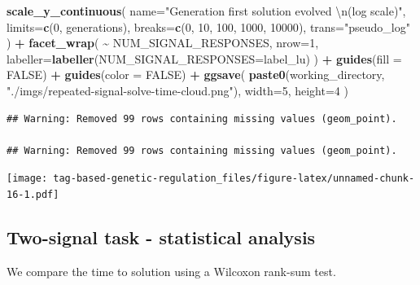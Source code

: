 \documentclass[
]{book}
\newenvironment{Shaded}{\begin{snugshade}}{\end{snugshade}}
\newcommand{\CharTok}[1]{\textcolor[rgb]{0.31,0.60,0.02}{#1}}
\newcommand{\DataTypeTok}[1]{\textcolor[rgb]{0.13,0.29,0.53}{#1}}
\newcommand{\DecValTok}[1]{\textcolor[rgb]{0.00,0.00,0.81}{#1}}
\newcommand{\KeywordTok}[1]{\textcolor[rgb]{0.13,0.29,0.53}{\textbf{#1}}}
\newcommand{\NormalTok}[1]{#1}
\newcommand{\OperatorTok}[1]{\textcolor[rgb]{0.81,0.36,0.00}{\textbf{#1}}}
\newcommand{\OtherTok}[1]{\textcolor[rgb]{0.56,0.35,0.01}{#1}}
\newcommand{\StringTok}[1]{\textcolor[rgb]{0.31,0.60,0.02}{#1}}
\begin{document}
\begin{Shaded}
\begin{Highlighting}[]
\StringTok{  }\KeywordTok{scale\_y\_continuous}\NormalTok{(}
    \DataTypeTok{name=}\StringTok{"Generation first solution evolved }\CharTok{\textbackslash{}n}\StringTok{(log scale)"}\NormalTok{,}
    \DataTypeTok{limits=}\KeywordTok{c}\NormalTok{(}\DecValTok{0}\NormalTok{, generations),}
    \DataTypeTok{breaks=}\KeywordTok{c}\NormalTok{(}\DecValTok{0}\NormalTok{, }\DecValTok{10}\NormalTok{, }\DecValTok{100}\NormalTok{, }\DecValTok{1000}\NormalTok{, }\DecValTok{10000}\NormalTok{),}
    \DataTypeTok{trans=}\StringTok{"pseudo\_log"}
\NormalTok{  ) }\OperatorTok{+}
\StringTok{  }\KeywordTok{facet\_wrap}\NormalTok{(}
    \OperatorTok{\textasciitilde{}}\StringTok{ }\NormalTok{NUM\_SIGNAL\_RESPONSES,}
    \DataTypeTok{nrow=}\DecValTok{1}\NormalTok{,}
    \DataTypeTok{labeller=}\KeywordTok{labeller}\NormalTok{(}\DataTypeTok{NUM\_SIGNAL\_RESPONSES=}\NormalTok{label\_lu)}
\NormalTok{  ) }\OperatorTok{+}
\StringTok{  }\KeywordTok{guides}\NormalTok{(}\DataTypeTok{fill =} \OtherTok{FALSE}\NormalTok{) }\OperatorTok{+}
\StringTok{  }\KeywordTok{guides}\NormalTok{(}\DataTypeTok{color =} \OtherTok{FALSE}\NormalTok{) }\OperatorTok{+}
\StringTok{  }\KeywordTok{ggsave}\NormalTok{(}
    \KeywordTok{paste0}\NormalTok{(working\_directory, }\StringTok{"./imgs/repeated{-}signal{-}solve{-}time{-}cloud.png"}\NormalTok{),}
    \DataTypeTok{width=}\DecValTok{5}\NormalTok{,}
    \DataTypeTok{height=}\DecValTok{4}
\NormalTok{  )}
\end{Highlighting}
\end{Shaded}

\begin{verbatim}
## Warning: Removed 99 rows containing missing values (geom_point).

## Warning: Removed 99 rows containing missing values (geom_point).
\end{verbatim}

\texttt{[image: tag-based-genetic-regulation\_files/figure-latex/unnamed-chunk-16-1.pdf]}

\hypertarget{two-signal-task---statistical-analysis}{%
\subsection{Two-signal task - statistical analysis}\label{two-signal-task---statistical-analysis}}

We compare the time to solution using a Wilcoxon rank-sum test.
\end{document}

